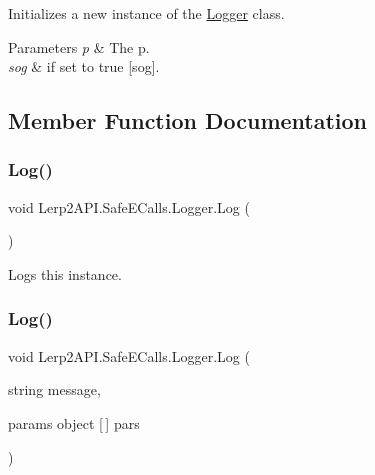 Initializes a new instance of the \hyperlink{class_lerp2_a_p_i_1_1_safe_e_calls_1_1_logger}{Logger} class. 


\begin{DoxyParams}{Parameters}
{\em p} & The p.\\
\hline
{\em sog} & if set to {\ttfamily true} \mbox{[}sog\mbox{]}.\\
\hline
\end{DoxyParams}


\subsection{Member Function Documentation}
\mbox{\label{class_lerp2_a_p_i_1_1_safe_e_calls_1_1_logger_afc13847cd5053a6e6aa0d5c8f41ce9cc}} 
\subsubsection{\texorpdfstring{Log()}{Log()}\hspace{0.1cm}{\footnotesize\ttfamily [1/2]}}
{\footnotesize\ttfamily void Lerp2\+A\+P\+I.\+Safe\+E\+Calls.\+Logger.\+Log (\begin{DoxyParamCaption}{ }\end{DoxyParamCaption})\hspace{0.3cm}{\ttfamily [inline]}}



Logs this instance. 

\mbox{\label{class_lerp2_a_p_i_1_1_safe_e_calls_1_1_logger_a67a56223a076c17cdc2f54160b4fd1b8}} 
\subsubsection{\texorpdfstring{Log()}{Log()}\hspace{0.1cm}{\footnotesize\ttfamily [2/2]}}
{\footnotesize\ttfamily void Lerp2\+A\+P\+I.\+Safe\+E\+Calls.\+Logger.\+Log (\begin{DoxyParamCaption}\item[{string}]{message,  }\item[{params object \mbox{[}$\,$\mbox{]}}]{pars }\end{DoxyParamCaption})\hspace{0.3cm}{\ttfamily [inline]}}



